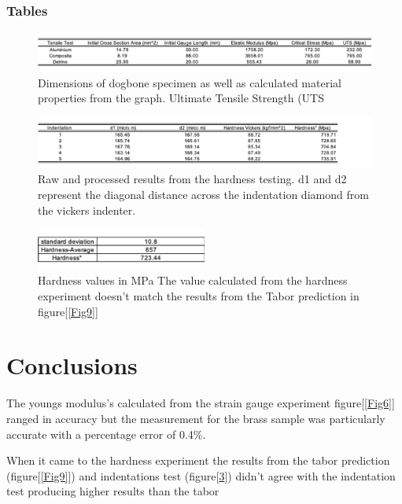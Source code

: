 \documentclass[a4paper,10pt]{article}
\begin{document}
\subsubsection{Tables}

\begin{figure}[!]
\centering
\includegraphics[width = \textwidth]{harndess_1.png}
\caption{Dimensions of dogbone specimen as well as calculated material properties from the graph. Ultimate Tensile Strength (UTS}
\label{Fig10}
\end{figure}
\begin{figure}[!]
\centering
\includegraphics[width = \textwidth]{hardness_2.png}
\caption{Raw and processed results from the hardness testing. d1 and d2 represent the diagonal distance across the indentation diamond from the vickers indenter.}
\label{Fig10}
\end{figure}
\begin{figure}[!]
\centering
\includegraphics[width = 0.5\textwidth]{hardness_3.png}
\caption{Hardness values in MPa
The value calculated from the hardness experiment doesn't match the results from the Tabor prediction in figure[\ref{Fig9}]}
\label{Hard}
\end{figure}




\newpage
\newpage
\section{Conclusions}
The youngs modulus's calculated from the strain gauge experiment figure[\ref{Fig6}] ranged in accuracy but the measurement for the brass sample was particularly accurate with a percentage error of 0.4\%. \par When it came to the hardness experiment the results from the tabor prediction (figure[\ref{Fig9}]) and indentations test (figure[\ref{Hard}]) didn't agree with the indentation test producing higher results than the tabor
\end{document}
